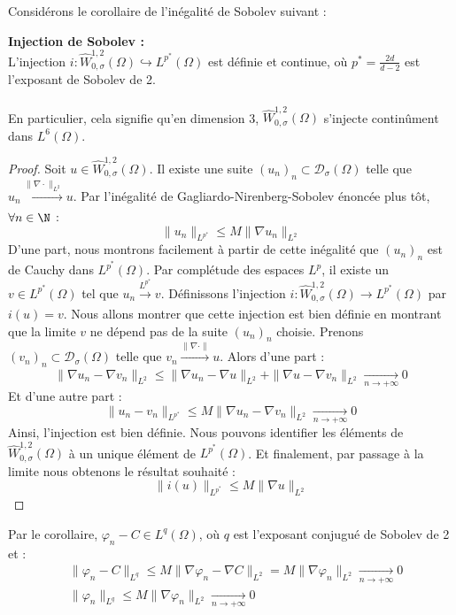 Considérons le corollaire de l'inégalité de Sobolev suivant :
\begin{propositionbox}
    \begin{corollary}
        \textbf{Injection de Sobolev :}\\
        L'injection $i : \widehat{W}_{0,\sigma}^{1,2}(\Omega) \hookrightarrow L^{p^*}(\Omega) $ est définie et continue, où $p^* = \frac{2d}{d - 2} $ est l'exposant de Sobolev de 2. \\
        \\
        En particulier, cela signifie qu'en dimension 3, $\widehat{W}_{0,\sigma}^{1,2}(\Omega)$ s'injecte continûment dans $L^6(\Omega)$. 
    \end{corollary}
\end{propositionbox} 
\begin{proof}
    Soit $u \in \widehat{W}_{0,\sigma}^{1,2}(\Omega)$. Il existe une suite $(u_n)_n \subset \mathcal{D}_{\sigma}(\Omega)$ telle que $u_n \xrightarrow[]{\|\nabla \cdot\|_{L^2}} u$.
    Par l'inégalité de Gagliardo-Nirenberg-Sobolev énoncée plus tôt, $\forall n \in \N$ :
    $$ \|u_n\|_{L^{p^*}} \leq M\|\nabla u_n\|_{L^2} $$
    D'une part, nous montrons facilement à partir de cette inégalité que $(u_n)_n$ est de Cauchy dans $L^{p^*}(\Omega)$. Par complétude des espaces $L^p$, il existe un $v \in L^{p^*}(\Omega)$ tel que $u_n \xrightarrow[]{L^{p^*}} v$. Définissons l'injection $i : \widehat{W}_{0,\sigma}^{1,2}(\Omega) \longrightarrow L^{p^*}(\Omega)$ par $i(u) = v$.
    Nous allons montrer que cette injection est bien définie en montrant que la limite $v$ ne dépend pas de la suite $(u_n)_n$ choisie. Prenons $(v_n)_n \subset \mathcal{D}_{\sigma}(\Omega)$ telle que $v_n \xrightarrow[]{\|\nabla \cdot \|} u$.
    Alors d'une part :
    $$ \|\nabla u_n - \nabla v_n\|_{L^2} \leq \| \nabla u_n - \nabla u \|_{L^2} + \| \nabla u - \nabla v_n \|_{L^2} \xrightarrow[n \to +\infty]{} 0 $$
    Et d'une autre part :
    $$ \| u_n - v_n \|_{L^{p^*}} \leq M \| \nabla u_n - \nabla v_n \|_{L^2} \xrightarrow[n \to +\infty]{} 0$$
    Ainsi, l'injection est bien définie. Nous pouvons identifier les éléments de $\widehat{W}_{0,\sigma}^{1,2}(\Omega)$ à un unique élément de $L^{p^*}(\Omega)$. Et finalement, par passage à la limite nous obtenons le résultat souhaité :
    $$ \|i(u)\|_{L^{p^*}} \leq M \|\nabla u\|_{L^2} $$
\end{proof}
Par le corollaire, $\varphi_n - C \in L^q(\Omega)$, où $q$ est l'exposant conjugué de Sobolev de 2 et :
\begin{align*}
    &\|\varphi_n - C\|_{L^q} \leq M \|\nabla \varphi_n - \nabla C \|_{L^2} = M\|\nabla \varphi_n\|_{L^2} \xrightarrow[n \to +\infty]{} 0 \\
    &\|\varphi_n\|_{L^q} \leq M \|\nabla \varphi_n\|_{L^2} \xrightarrow[n \to +\infty]{} 0
\end{align*}
